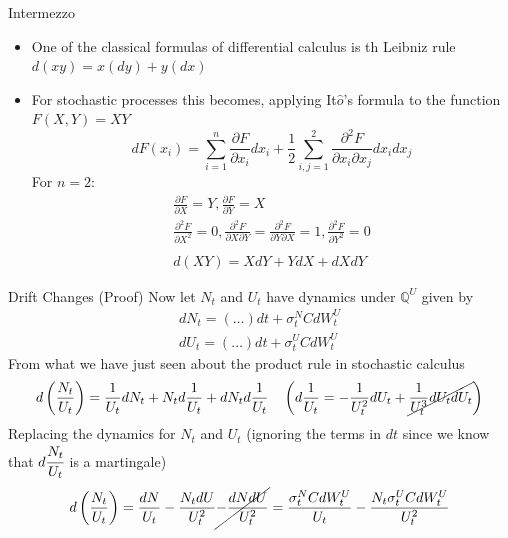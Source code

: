 \documentclass{beamer}
\begin{document}
\begin{frame}{Intermezzo}
  \begin{itemize}
  \item One of the classical formulas of differential calculus is th Leibniz rule $d(x y) = x(dy) + y(dx)$
  \item For stochastic processes this becomes, applying It$\hat{o}$'s formula to the function $F(X,Y) = XY$
    \begin{equation*}
      dF(x_i)=\sum_{i=1}^n \frac{\partial F}{\partial x_i}dx_i
      +\frac{1}{2}\sum_{i,j=1}^2 \frac{\partial^2 F}{\partial x_i \partial x_j}dx_i dx_j
    \end{equation*}
  For $n=2$:
    \begin{equation*}
      \begin{gathered}
        \frac{\partial F}{\partial X}=Y,\frac{\partial F}{\partial Y}=X \\
        \frac{\partial^2 F}{\partial X^2}=0,\frac{\partial^2 F}{\partial X\partial Y}=\frac{\partial^2 F}{\partial Y\partial X}=1,\frac{\partial^2 F}{\partial Y^2}=0\\
        \\
        d(XY) = XdY + YdX + dXdY
      \end{gathered}
    \end{equation*}
  \end{itemize}
\end{frame}

\begin{frame}{Drift Changes (Proof)}	
Now let $N_t$ and $U_t$ have dynamics under $\mathbb{Q}^U$ given by 
\begin{equation*}
	\begin{gathered}
		dN_t = (\ldots) dt + \sigma_t^NCdW^U_t\\
		dU_t = (\ldots) dt + \sigma_t^UCdW^U_t 
	\end{gathered}
\end{equation*}
	\pause
        From what we have just seen about the product rule in stochastic calculus
        \begin{equation*}
          \begin{gathered}
            d\left(\frac{N_t}{U_t}\right)=\frac{1}{U_t}dN_t+N_td\frac{1}{U_t}+dN_td\frac{1}{U_t} \quad \left(d\frac{1}{U_t}=-\frac{1}{U^2_t}dU_t+\cancel{\frac{1}{U^3_t}dU_tdU_t}\right) \\
          \end{gathered}
  \end{equation*}
	\pause
  Replacing the dynamics for $N_t$ and $U_t$ (ignoring the terms in $dt$ since we know that $d\cfrac{N_t}{U_t}$ is a martingale)
  \begin{equation}
    d\left(\frac{N_t}{U_t}\right) = \frac{dN}{U_t}-\frac{N_tdU}{U^2_t}\cancel{-\frac{dNdU}{U_t^2}}=\frac{\sigma^N_t CdW^U_t}{U_t} - \frac{N_t\sigma^U_t C dW^U_t}{U^2_t}
    \label{eq:dnu}
  \end{equation}
\end{frame}
\end{document}
